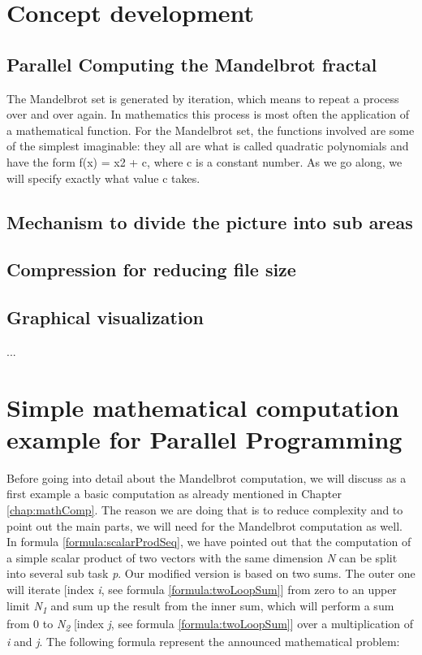 \section{Concept development}


\subsection{Parallel Computing the Mandelbrot fractal}
The Mandelbrot set is generated by iteration, which means to repeat a process over and over again. In mathematics this process is most often the application of a mathematical function.
For the Mandelbrot set, the functions involved are some of the simplest imaginable: they all are what is called quadratic polynomials and have the form f(x) = x2 + c, where c is a constant number. As we go along, we will specify exactly what value c takes.

\subsection{Mechanism to divide the picture into sub areas}

\subsection{Compression for reducing file size}

\subsection{Graphical visualization}

...\newpage

\section{Simple mathematical computation example for Parallel Programming} \label{chap:simpleMathCompParallel}

Before going into detail about the Mandelbrot computation, we will discuss as a first example a basic computation as already mentioned in Chapter \ref{chap:mathComp}. The reason we are doing that is to reduce complexity and to point out the main parts, we will need for the Mandelbrot computation as well. In formula \ref{formula:scalarProdSeq}, we have pointed out that the computation of a simple scalar product of two vectors with the same dimension \textit{N} can be split into several sub task \textit{p}. Our modified version is based on two sums. The outer one will iterate [index \textit{i}, see formula \ref{formula:twoLoopSum}] from zero to an upper limit \textit{N\textsubscript{1}} and sum up the result from the inner sum, which will perform a sum from 0 to \textit{N\textsubscript{2}} [index \textit{j}, see formula \ref{formula:twoLoopSum}] over a multiplication of \textit{i} and \textit{j}. The following formula represent the announced mathematical problem:

